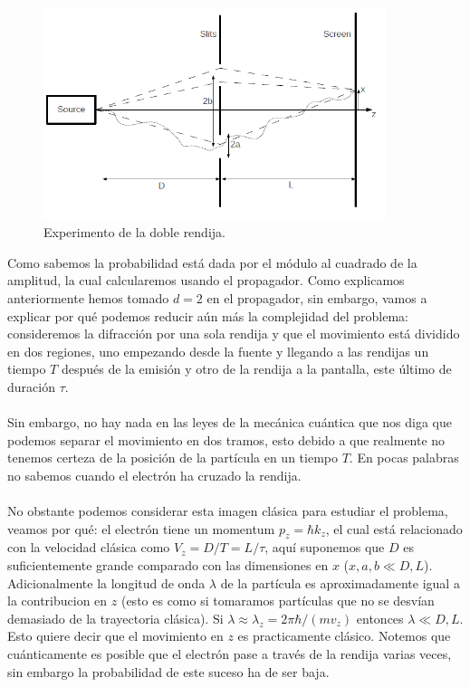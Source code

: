 \begin{figure}[h]
\centering
\includegraphics[width=10cm]{Imagenes/Fig8}
\caption[Esquema del experimento de la doble rendija en 2D]{Experimento de la doble rendija.}
\end{figure}
Como sabemos la probabilidad está dada por el módulo al cuadrado de la amplitud, la cual calcularemos usando el propagador. Como explicamos anteriormente hemos tomado $d=2$ en el propagador, sin embargo, vamos a explicar por qué podemos reducir aún más la complejidad del problema: consideremos la difracción por una sola rendija y que el movimiento está dividido en dos regiones, uno empezando desde la fuente y llegando a las rendijas un tiempo $T$ después de la emisión y otro de la rendija a la pantalla, este último de duración $\tau$.
\\
\\
Sin embargo, no hay nada en las leyes de la mecánica cuántica que nos diga que podemos separar el movimiento en dos tramos, esto debido a que realmente no tenemos certeza de la posición de la partícula en un tiempo $T$. En pocas palabras no sabemos cuando el electrón ha cruzado la rendija.
\\
\\
No obstante podemos considerar esta imagen clásica para estudiar el problema, veamos por qué: el electrón tiene un momentum $p_z=\hbar k_z$, el cual está relacionado con la velocidad clásica como $V_z=D/T=L/\tau$, aquí suponemos que $D$ es suficientemente grande comparado con las dimensiones en $x$ ($x,a,b\ll D,L$). Adicionalmente la longitud de onda $\lambda$ de la partícula es aproximadamente igual a la contribucion en $z$ (esto es como si tomaramos partículas que no se desvían demasiado de la trayectoria clásica). Si $\lambda \approx \lambda_z=2\pi\hbar/(mv_z)$ entonces $\lambda \ll D,L$. Esto quiere decir que el movimiento en $z$ es practicamente clásico. Notemos que cuánticamente es posible que el electrón pase a través de la rendija varias veces, sin embargo la probabilidad de este suceso ha de ser baja.

